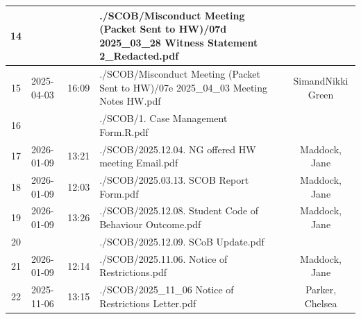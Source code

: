 \begin{landscape}
\begin{tabularx}{\linewidth}{|c|l|l|X|c|c|}
		14                               &                     &                & ./SCOB/Misconduct Meeting (Packet Sent to HW)/07d 2025\_03\_28 Witness Statement 2\_Redacted.pdf                       &                         &                          \\ \hline
		15                               & 2025-04-03          & 16:09          & ./SCOB/Misconduct Meeting (Packet Sent to HW)/07e 2025\_04\_03 Meeting Notes HW.pdf                                    &                         & SimandNikki Green        \\ \hline
		16                               &                     &                & ./SCOB/1. Case Management Form.R.pdf                                                                                   &                         &                          \\ \hline
		17                               & 2026-01-09          & 13:21          & ./SCOB/2025.12.04. NG offered HW meeting Email.pdf                                                                     &                         & Maddock, Jane            \\ \hline
		18                               & 2026-01-09          & 12:03          & ./SCOB/2025.03.13. SCOB Report Form.pdf                                                                                &                         & Maddock, Jane            \\ \hline
		19                               & 2026-01-09          & 13:26          & ./SCOB/2025.12.08. Student Code of Behaviour Outcome.pdf                                                               &                         & Maddock, Jane            \\ \hline
		20                               &                     &                & ./SCOB/2025.12.09. SCoB Update.pdf                                                                                     &                         &                          \\ \hline
		21                               & 2026-01-09          & 12:14          & ./SCOB/2025.11.06. Notice of Restrictions.pdf                                                                          &                         & Maddock, Jane            \\ \hline
		22                               & 2025-11-06          & 13:15          & ./SCOB/2025\_11\_06 Notice of Restrictions Letter.pdf                                                                  &                         & Parker, Chelsea          \\ \hline

\end{tabularx}
\end{landscape}
